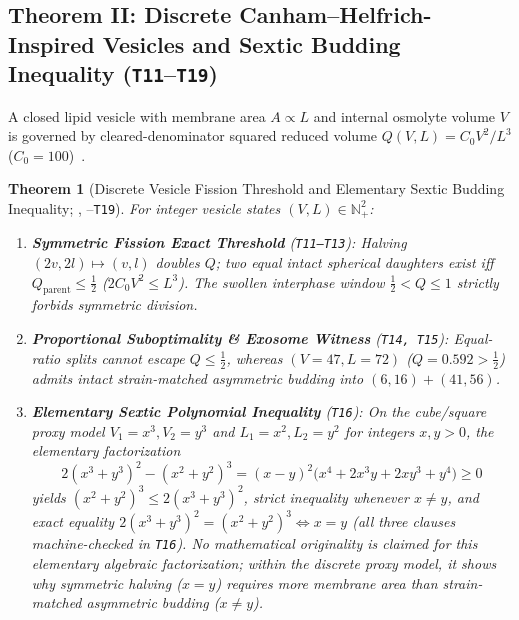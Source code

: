 \documentclass[11pt,reqno]{amsart}
\theoremstyle{plain}
\newtheorem{theorem}{Theorem}[section]
\theoremstyle{definition}
\theoremstyle{remark}
\newcommand{\tcode}[1]{{\scriptsize\nolinkurl{#1}}}
\begin{document}
\subsection{Theorem II: Discrete Canham--Helfrich-Inspired Vesicles and Sextic Budding Inequality (\texttt{T11}--\texttt{T19})}
A closed lipid vesicle with membrane area $A \propto L$ and internal osmolyte volume $V$ is governed by cleared-denominator squared reduced volume $Q(V, L) = C_0 V^2 / L^3$ ($C_0 = 100$)~\cite{canham1970,helfrich1973,zhu2009,svetina2009}.

\begin{theorem}[Discrete Vesicle Fission Threshold and Elementary Sextic Budding Inequality; {\normalfont\tcode{MembraneGeometry.lean}}, {\normalfont\tcode{T11}--\tcode{T19}}]
\label{thm:sextic}
For integer vesicle states $(V, L) \in \mathbb{N}_+^2$:
\begin{enumerate}[leftmargin=1.8em, itemsep=1.5pt]
  \item \textbf{Symmetric Fission Exact Threshold} (\textup{\texttt{T11--T13}}): Halving $(2v, 2l) \mapsto (v, l)$ doubles $Q$; two equal intact spherical daughters exist \emph{iff} $Q_{\mathrm{parent}} \le \tfrac{1}{2}$ ($2 C_0 V^2 \le L^3$). The swollen interphase window $\tfrac{1}{2} < Q \le 1$ strictly forbids symmetric division.
  \item \textbf{Proportional Suboptimality \& Exosome Witness} (\textup{\texttt{T14, T15}}): Equal-ratio splits cannot escape $Q \le \tfrac{1}{2}$, whereas $(V=47, L=72)$ ($Q=0.592 > \tfrac{1}{2}$) admits intact strain-matched asymmetric budding into $(6,16) + (41,56)$.
  \item \textbf{Elementary Sextic Polynomial Inequality} (\textup{\texttt{T16}}): On the cube/square proxy model $V_1 = x^3, V_2 = y^3$ and $L_1 = x^2, L_2 = y^2$ for integers $x, y > 0$, the elementary factorization
  \begin{equation}
    2(x^3 + y^3)^2 - (x^2 + y^2)^3 = (x - y)^2 \bigl(x^4 + 2x^3 y + 2x y^3 + y^4\bigr) \ge 0
    \label{eq:sextic}
  \end{equation}
  yields $(x^2 + y^2)^3 \le 2(x^3 + y^3)^2$, strict inequality whenever $x \neq y$, and exact equality $2(x^3 + y^3)^2 = (x^2 + y^2)^3 \iff x = y$ (all three clauses machine-checked in \texttt{T16}). No mathematical originality is claimed for this elementary algebraic factorization; within the discrete proxy model, it shows why symmetric halving ($x = y$) requires more membrane area than strain-matched asymmetric budding ($x \neq y$).
\end{enumerate}
\end{theorem}
\end{document}

